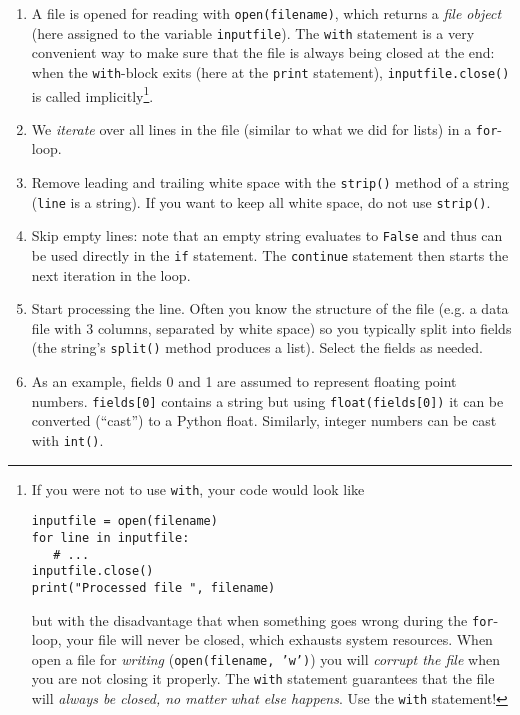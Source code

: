 \documentclass[letterpaper]{scrartcl}
\begin{document}
\begin{enumerate}
\item A file is opened for reading with \texttt{open(filename)}, which
  returns a \emph{file object} (here assigned to the variable
  \texttt{inputfile}). The \texttt{with} statement is a very
  convenient way to make sure that the file is always being closed at
  the end: when the \texttt{with}-block exits (here at the
  \texttt{print} statement), \texttt{inputfile.close()} is called
  implicitly\cprotect\footnote{If you were not to use \texttt{with},
    your code would look like
\begin{verbatim}
inputfile = open(filename)
for line in inputfile:
   # ...
inputfile.close()
print("Processed file ", filename)
\end{verbatim}
    but with the disadvantage that when something goes wrong during
    the \texttt{for}-loop, your file will never be closed, which
    exhausts system resources. When open a file for \emph{writing}
    (\texttt{open(filename, 'w')}) you will \emph{corrupt the file}
    when you are not closing it properly. The \texttt{with} statement
    guarantees that the file will \emph{always be closed, no matter
      what else happens}. Use the \texttt{with} statement!}.
\item We \emph{iterate} over all lines in the file (similar to what we
  did for lists) in a \texttt{for}-loop.
\item Remove leading and trailing white space with the
  \texttt{strip()} method of a string (\texttt{line} is a string). If
  you want to keep all white space, do not use \texttt{strip()}.
\item Skip empty lines: note that an empty string evaluates to
  \texttt{False} and thus can be used directly in the \texttt{if}
  statement. The \texttt{continue} statement then starts the next
  iteration in the loop.
\item Start processing the line. Often you know the structure of the
  file (e.g. a data file with 3 columns, separated by white space) so
  you typically split into fields (the string's \texttt{split()}
  method produces a list). Select the fields as needed.
\item As an example, fields 0 and 1 are assumed to represent floating
  point numbers. \texttt{fields[0]} contains a string but using
  \texttt{float(fields[0])} it can be converted (``cast'') to a Python
  float. Similarly, integer numbers can be cast with \texttt{int()}.
\end{enumerate}
\end{document}

